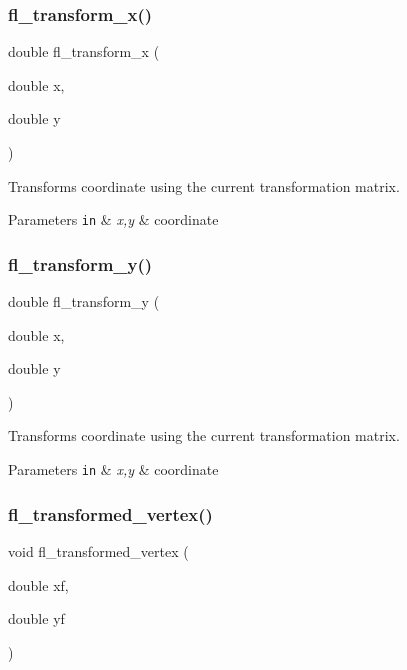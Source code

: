 \subsubsection{\texorpdfstring{fl\+\_\+transform\+\_\+x()}{fl\_transform\_x()}}
{\footnotesize\ttfamily double fl\+\_\+transform\+\_\+x (\begin{DoxyParamCaption}\item[{double}]{x,  }\item[{double}]{y }\end{DoxyParamCaption})\hspace{0.3cm}{\ttfamily [inline]}}

Transforms coordinate using the current transformation matrix. 
\begin{DoxyParams}[1]{Parameters}
\mbox{\tt in}  & {\em x,y} & coordinate \\
\hline
\end{DoxyParams}
\mbox{\label{group__fl__drawings_gaf68ee505a886277680f704a86ea7ea86}} 
\subsubsection{\texorpdfstring{fl\+\_\+transform\+\_\+y()}{fl\_transform\_y()}}
{\footnotesize\ttfamily double fl\+\_\+transform\+\_\+y (\begin{DoxyParamCaption}\item[{double}]{x,  }\item[{double}]{y }\end{DoxyParamCaption})\hspace{0.3cm}{\ttfamily [inline]}}

Transforms coordinate using the current transformation matrix. 
\begin{DoxyParams}[1]{Parameters}
\mbox{\tt in}  & {\em x,y} & coordinate \\
\hline
\end{DoxyParams}
\mbox{\label{group__fl__drawings_ga4069ce7f3661ee913869bf71dbb5d5e7}} 
\subsubsection{\texorpdfstring{fl\+\_\+transformed\+\_\+vertex()}{fl\_transformed\_vertex()}}
{\footnotesize\ttfamily void fl\+\_\+transformed\+\_\+vertex (\begin{DoxyParamCaption}\item[{double}]{xf,  }\item[{double}]{yf }\end{DoxyParamCaption})\hspace{0.3cm}{\ttfamily [inline]}}

